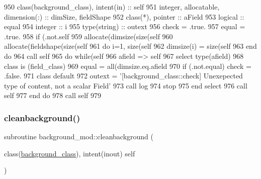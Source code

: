 \begin{DoxyCode}
950     \textcolor{keywordtype}{class}(background\_class), \textcolor{keywordtype}{intent(in)} :: self
951     \textcolor{keywordtype}{integer}, \textcolor{keywordtype}{allocatable}, \textcolor{keywordtype}{dimension(:)} :: dimSize, fieldShape
952     \textcolor{keywordtype}{class}(*), \textcolor{keywordtype}{pointer} :: aField
953     \textcolor{keywordtype}{logical} :: equal
954     \textcolor{keywordtype}{integer} :: i
955     \textcolor{keywordtype}{type}(string) :: outext
956     check = .true.
957     equal = .true.
958     \textcolor{keywordflow}{if} (.not.self%
959     \textcolor{keyword}{allocate}(dimsize(\textcolor{keyword}{size}(self%
960     \textcolor{keyword}{allocate}(fieldshape(\textcolor{keyword}{size}(self%
961     \textcolor{keywordflow}{do} i=1, \textcolor{keyword}{size}(self%
962         dimsize(i) = \textcolor{keyword}{size}(self%
963 \textcolor{keywordflow}{    end do}
964     \textcolor{keyword}{call }self%
965     \textcolor{keywordflow}{do} \textcolor{keywordflow}{while}(self%
966         afield => self%
967         \textcolor{keywordflow}{select type}(afield)
968 \textcolor{keywordflow}{        class is} (field\_class)
969             equal = all(dimsize.eq.afield%
970             \textcolor{keywordflow}{if} (.not.equal) check = .false.
971 \textcolor{keywordflow}{            class default}
972             outext = \textcolor{stringliteral}{'[background\_class::check] Unexepected type of content, not a scalar Field'}
973             \textcolor{keyword}{call }log%
974             stop
975 \textcolor{keywordflow}{        end select}
976         \textcolor{keyword}{call }self%
977 \textcolor{keywordflow}{    end do}
978     \textcolor{keyword}{call }self%
979 
\end{DoxyCode}
\mbox{\label{namespacebackground__mod_a1610fcc9ce260beb3c35418e92a63391}} 
\subsubsection{\texorpdfstring{cleanbackground()}{cleanbackground()}}
{\footnotesize\ttfamily subroutine background\+\_\+mod\+::cleanbackground (\begin{DoxyParamCaption}\item[{class(\mbox{\hyperlink{structbackground__mod_1_1background__class}{background\+\_\+class}}), intent(inout)}]{self }\end{DoxyParamCaption})\hspace{0.3cm}{\ttfamily [private]}}



